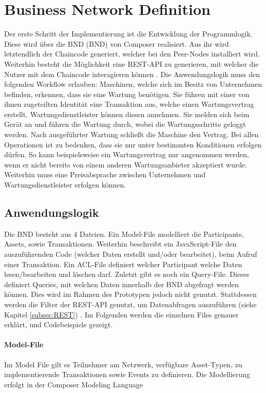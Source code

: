 \section{Business Network Definition}
Der erste Schritt der Implementierung ist die Entwicklung der Programmlogik. Diese wird über die \acl{BND} (\acs{BND}) von Composer realisiert. Aus ihr wird letztendlich der Chaincode generiert, welcher bei den Peer-Nodes installiert wird. Weiterhin besteht die Möglichkeit eine REST-API zu generieren, mit welcher die Nutzer mit dem Chaincode interagieren können \cite{HyperledgerComposerTeamDeveloperTutorialHyperledger}. Die Anwendungslogik muss den folgenden Workflow erlauben: Maschinen, welche sich im Besitz von Unternehmen befinden, erkennen, dass sie eine Wartung benötigen. Sie führen mit einer von ihnen zugeteilten Identität eine Transaktion aus, welche einen Wartungsvertrag erstellt. Wartungsdienstleister können diesen annehmen. Sie melden sich beim Gerät an und führen die Wartung durch, wobei die Wartungsschritte geloggt werden. Nach ausgeführter Wartung schließt die Maschine den Vertrag. Bei allen Operationen ist zu bedenken, dass sie nur unter bestimmten Konditionen erfolgen dürfen. So kann beispielsweise ein Wartungsvertrag nur angenommen werden, wenn er nicht bereits von einem anderen Wartungsanbieter akzeptiert wurde. Weiterhin muss eine Preisabsprache zwischen Unternehmen und Wartungsdienstleister erfolgen können. 

\subsection{Anwendungslogik}
Die \acs{BND} besteht aus 4 Dateien. Ein Model-File modelliert die Participants, Assets, sowie Transaktionen. Weiterhin beschreibt ein JavaScript-File den auszuführenden Code (welcher Daten erstellt und/oder bearbeitet), beim Aufruf einer Transaktion. Ein ACL-File definiert welcher Participant welche Daten lesen/bearbeiten und löschen darf. Zuletzt gibt es noch ein Query-File. Dieses definiert Queries, mit welchen Daten innerhalb der \acs{BND} abgefragt werden können. Dies wird im Rahmen des Prototypen jedoch nicht genutzt. Stattdessen werden die Filter der REST-API genutzt, um Datenabfragen auszuführen (siehe Kapitel \ref{subsec:REST}) \cite{HyperledgerComposerTeamIntroductionHyperledgerComposer}. Im Folgenden werden die einzelnen Files genauer erklärt, und Codebeispiele gezeigt.

\paragraph{Model-File}
Im Model File gilt es Teilnehmer am Netzwerk, verfügbare Asset-Typen, zu implementierende Transaktionen sowie Events zu definieren. Die Modellierung erfolgt in der Composer Modeling Language \cite{HyperledgerComposerTeamModelingLanguageHyperledger}

